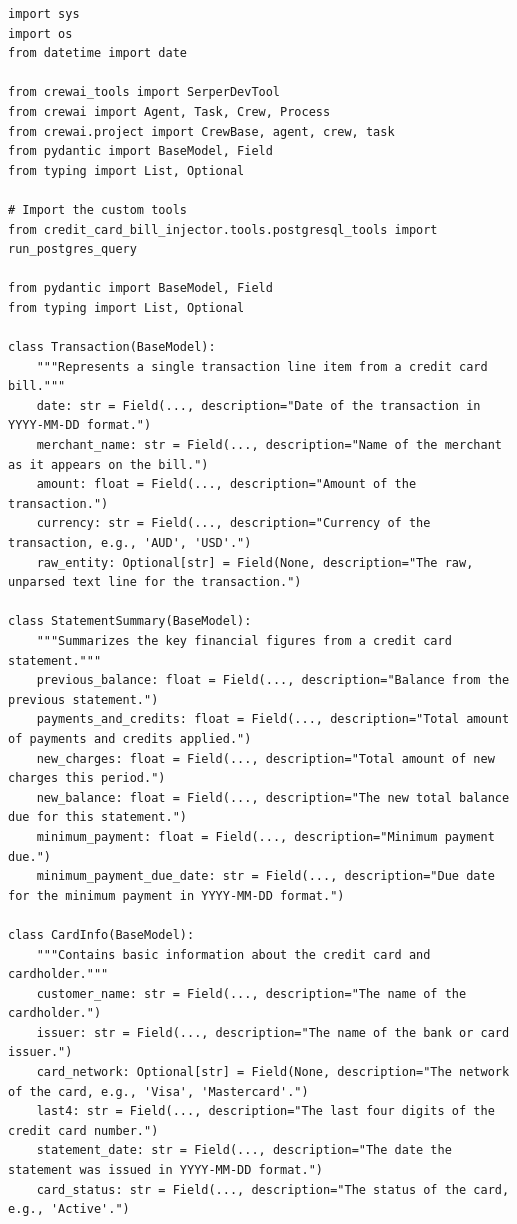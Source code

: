 \begin{lstlisting}
import sys
import os
from datetime import date

from crewai_tools import SerperDevTool
from crewai import Agent, Task, Crew, Process
from crewai.project import CrewBase, agent, crew, task
from pydantic import BaseModel, Field
from typing import List, Optional

# Import the custom tools
from credit_card_bill_injector.tools.postgresql_tools import run_postgres_query

from pydantic import BaseModel, Field
from typing import List, Optional

class Transaction(BaseModel):
    """Represents a single transaction line item from a credit card bill."""
    date: str = Field(..., description="Date of the transaction in YYYY-MM-DD format.")
    merchant_name: str = Field(..., description="Name of the merchant as it appears on the bill.")
    amount: float = Field(..., description="Amount of the transaction.")
    currency: str = Field(..., description="Currency of the transaction, e.g., 'AUD', 'USD'.")
    raw_entity: Optional[str] = Field(None, description="The raw, unparsed text line for the transaction.")

class StatementSummary(BaseModel):
    """Summarizes the key financial figures from a credit card statement."""
    previous_balance: float = Field(..., description="Balance from the previous statement.")
    payments_and_credits: float = Field(..., description="Total amount of payments and credits applied.")
    new_charges: float = Field(..., description="Total amount of new charges this period.")
    new_balance: float = Field(..., description="The new total balance due for this statement.")
    minimum_payment: float = Field(..., description="Minimum payment due.")
    minimum_payment_due_date: str = Field(..., description="Due date for the minimum payment in YYYY-MM-DD format.")

class CardInfo(BaseModel):
    """Contains basic information about the credit card and cardholder."""
    customer_name: str = Field(..., description="The name of the cardholder.")
    issuer: str = Field(..., description="The name of the bank or card issuer.")
    card_network: Optional[str] = Field(None, description="The network of the card, e.g., 'Visa', 'Mastercard'.")
    last4: str = Field(..., description="The last four digits of the credit card number.")
    statement_date: str = Field(..., description="The date the statement was issued in YYYY-MM-DD format.")
    card_status: str = Field(..., description="The status of the card, e.g., 'Active'.")


\end{lstlisting}

